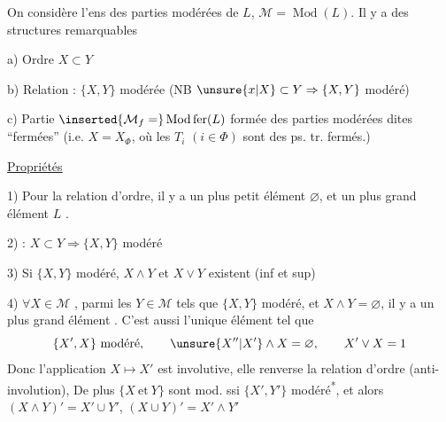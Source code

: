 On considère l'ens   des parties modérées de $L$, $\mathcal M=\operatorname{Mod}(L)$. Il y a des structures remarquables

a) Ordre \quad $X\subset Y$

b) Relation : $\{X,Y\}$ modérée \quad (NB $\unsure{x|X}\subset Y\Rightarrow\{X,Y\}$ modéré)

c) Partie $\inserted{\mathcal M_f=}\operatorname{Mod}\mathrm{fer}(L)$ formée des parties modérées dites ``fermées'' (i.e. $X=X_{\Phi}$, où les $T_i$ $(i\in\Phi)$ sont des ps. tr. fermés.)

\uline{Propriétés}

1) Pour la relation d'ordre, il y a un plus petit élément $\varnothing$, et un plus grand élément $L$ .

2) : $X\subset Y\Rightarrow\{X,Y\}$ modéré

3) Si $\{X,Y\}$ modéré, $X\wedge Y$ et $X\vee Y$ existent (inf et sup)

  

4)  $\forall X\in\mathcal M$ ,  parmi les $Y\in\mathcal M$ tels que $\{X,Y\}$ modéré, et $X\wedge Y=\varnothing$, il y a un plus grand élément . C'est aussi l'unique élément tel que
\[
\{X',X\}\text{ modéré},\qquad \unsure{X''|X'}\wedge X=\varnothing,\qquad X'\vee X=1
\]
Donc l'application $X\mapsto X'$ est involutive, elle renverse la relation d'ordre (anti-involution),  De plus $\{X\ \mathrm{et}\ Y\}$ sont mod. ssi $\{X',Y'\}$ modéré\textsuperscript{*},
et alors \quad $(X\wedge Y)'=X'\cup Y'$, \quad $(X\cup Y)'=X'\wedge Y'$

